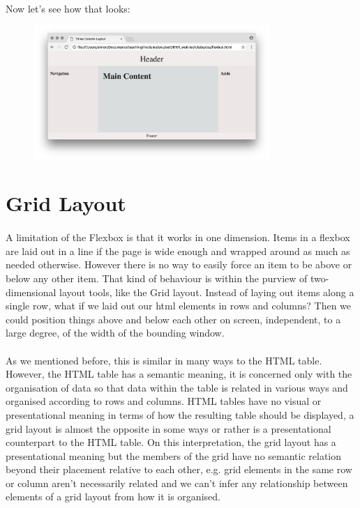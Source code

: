 \paragraph{} Now let's see how that looks:


\begin{figure}[H]
\centering
\includegraphics[width=0.8\textwidth]{figures/flexbox-ui-example}
\label{fig:flexbox-ui-example}
\caption{}
\end{figure}



\section{Grid Layout}
\paragraph{} A limitation of the Flexbox is that it works in one dimension. Items in a flexbox are laid out in a line if the page is wide enough and wrapped around as much as needed otherwise. However there is no way to easily force an item to be above or below any other item. That kind of behaviour is within the purview of two-dimensional layout tools, like the Grid layout. Instead of laying out items along a single row, what if we laid out our html elements in rows and columns? Then we could position things above and below each other on screen, independent, to a large degree, of the width of the  bounding window.
\paragraph{} As we mentioned before, this is similar in many ways to the HTML table. However, the HTML table has a semantic meaning, it is concerned only with the organisation of data so that data within the table is related in various ways and organised according to rows and columns.  HTML tables have no visual or presentational meaning in terms of how the resulting table should be displayed, a grid layout is almost the opposite in some ways or rather is a presentational counterpart to the HTML table. On this interpretation, the grid layout has a presentational meaning but the members of the grid have no semantic relation beyond their placement relative to each other, e.g. grid elements in the same row or column aren’t necessarily related and we can't infer any relationship between elements of a grid layout from how it is organised.


